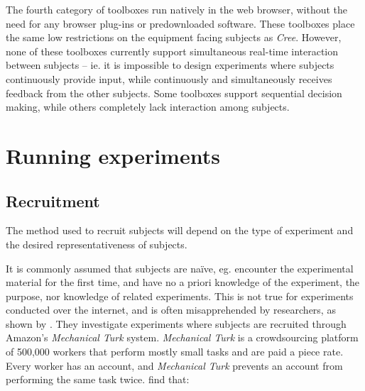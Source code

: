 \documentclass[preprint, 12pt]{elsarticle}
\newcommand{\Cree}{\emph{Cree}\xspace}
\begin{document}

The fourth category of toolboxes run natively in the web browser, without the need for any browser plug-ins or predownloaded software. These toolboxes place the same low restrictions on the equipment facing subjects as \Cree. However, none of these toolboxes currently support simultaneous real-time interaction between subjects -- ie. it is impossible to design experiments where subjects continuously provide input, while continuously and simultaneously receives feedback from the other subjects. Some toolboxes support sequential decision making, while others completely lack interaction among subjects.


\section{Running experiments}
\label{S:Running}

\subsection{Recruitment}

The method used to recruit subjects will depend on the type of experiment and the desired representativeness of subjects. 

It is commonly assumed that subjects are naïve, eg. encounter the experimental material for the first time, and have no a priori knowledge of the experiment, the purpose, nor knowledge of related experiments. This is not true for experiments conducted over the internet, and is often misapprehended by researchers, as shown by \citet*{Chandler_Mueller_Paolacci_2014}. They investigate experiments where subjects are recruited through Amazon's \emph{Mechanical Turk} system. \emph{Mechanical Turk} is a crowdsourcing platform of 500,000 workers that perform mostly small tasks and are paid a piece rate. Every worker has an account, and \emph{Mechanical Turk} prevents an account from performing the same task twice. \cite{Chandler_Mueller_Paolacci_2014} find that: 
\end{document}
